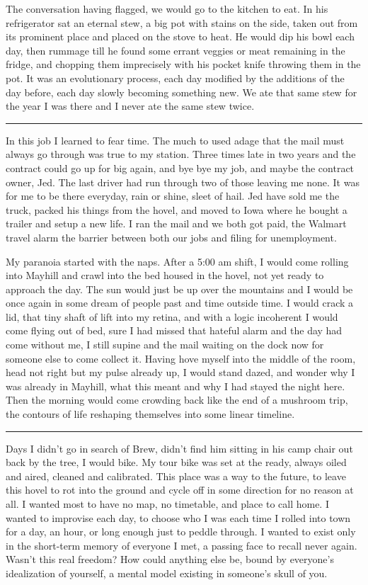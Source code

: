 \documentclass[ebook, 10pt, openright, onecolumn]{memoir}
\newcommand*\td[1]{
  \todo[inline]{
     #1 
  }
}
\newcommand*\starbreak{\fancybreak*{\Large{* * *}}}
\newcommand*\finish{\td{ ----- Finish this section -----}}
\begin{document}
The conversation having flagged, we would go to the kitchen to eat.  In his
refrigerator sat an eternal stew, a big pot with stains on the side, taken out
from its prominent place and placed on the stove to heat.  He would dip his bowl
each day, then rummage till he found some errant veggies or meat remaining in
the fridge, and chopping them imprecisely with his pocket knife throwing them in
the pot.  It was an evolutionary process, each day modified by the additions of
the day before, each day slowly becoming something new.  We ate that same stew
for the year I was there and I never ate the same stew twice.

\starbreak

In this job I learned to fear time.  The much to used adage that the mail must
always go through was true to my station. Three times late in two years and the
contract could go up for big again, and bye bye my job, and maybe the contract
owner, Jed.  The last driver had run through two of those leaving me none.  It
was for me to be there everyday, rain or shine, sleet of hail.  Jed have sold me
the truck, packed his things from the hovel, and moved to Iowa where he bought a
trailer and setup a new life.  I ran the mail and we both got paid, the Walmart
travel alarm the barrier between both our jobs and filing for unemployment.

My paranoia started with the naps.  After a 5:00 am shift, I would come rolling
into Mayhill and crawl into the bed housed in the hovel, not yet ready to
approach the day.  The sun would just be up over the mountains and I would be
once again in some dream of people past and time outside time.  I would crack a
lid, that tiny shaft of lift into my retina, and with a logic incoherent I would
come flying out of bed, sure I had missed that hateful alarm and the day had
come without me, I still supine and the mail waiting on the dock now for
someone else to come collect it.  Having hove myself into the middle of the
room, head not right but my pulse already up, I would stand dazed, and wonder
why I was already in Mayhill, what this meant and why I had stayed the night
here.  Then the morning would come crowding back like the end of a mushroom
trip, the contours of life reshaping themselves into some linear timeline. 


\finish


\starbreak

Days I didn't go in search of Brew, didn't find him sitting in his
camp chair out back by the tree, I would bike.  My tour bike was set at the
ready, always oiled and aired, cleaned and calibrated.  This place was a way to
the future, to leave this hovel to rot into the ground and cycle off in some
direction for no reason at all.  I wanted most to have no map, no timetable, and
place to call home.  I wanted to improvise each day, to choose who I was each
time I rolled into town for a day, an hour, or long enough just to peddle
through.  I wanted to exist only in the short-term memory of everyone I met, a
passing face to recall never again.  Wasn't this real freedom?  How could
anything else be, bound by everyone's idealization of yourself, a mental model
existing in someone's skull of you.
\end{document}
